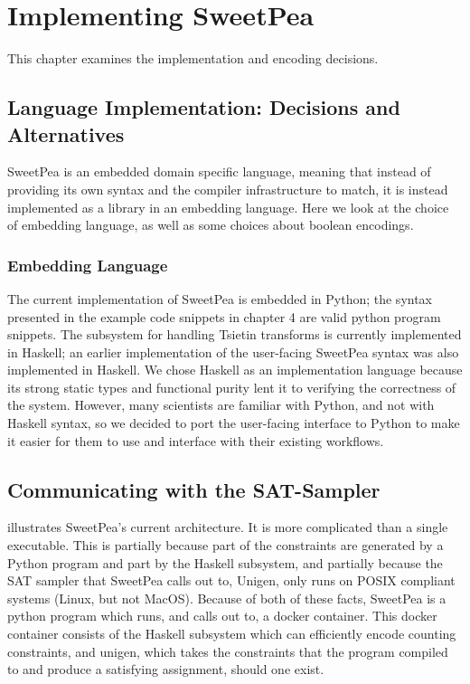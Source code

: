 
\chapter{Implementing SweetPea}

This chapter examines the implementation and encoding decisions.

\section{Language Implementation: Decisions and Alternatives}

SweetPea is an embedded domain specific language, meaning that instead of providing its own syntax and the compiler infrastructure to match, it is instead implemented as a library in an embedding language. Here we look at the choice of embedding language, as well as some choices about boolean encodings.

\subsection{Embedding Language}

The current implementation of SweetPea is embedded in Python; the syntax presented in the example code snippets in chapter 4 are valid python program snippets. The subsystem for handling Tsietin transforms is currently implemented in Haskell; an earlier implementation of the user-facing SweetPea syntax was also implemented in Haskell. We chose Haskell as an implementation language because its strong static types and functional purity lent it to verifying the correctness of the system. However, many scientists are familiar with Python, and not with Haskell syntax, so we decided to port the user-facing interface to Python to make it easier for them to use and interface with their existing workflows.

\section{Communicating with the SAT-Sampler}

 illustrates SweetPea's current architecture. It is more complicated than a single executable. This is partially because part of the constraints are generated by a Python program and part by the Haskell subsystem, and partially because the SAT sampler that SweetPea calls out to, Unigen, only runs on POSIX compliant systems (Linux, but not MacOS). Because of both of these facts, SweetPea is a python program which runs, and calls out to, a docker container. This docker container consists of the Haskell subsystem which can efficiently encode counting constraints, and unigen, which takes the constraints that the program compiled to and produce a satisfying assignment, should one exist.

